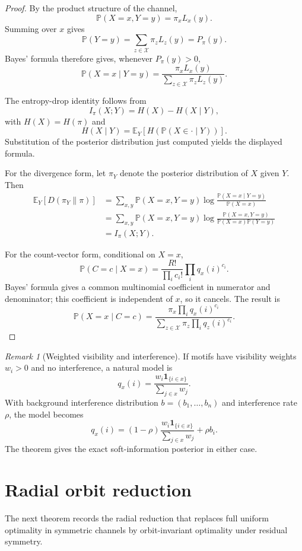 \documentclass[11pt]{article}
\theoremstyle{definition}
\theoremstyle{remark}
\newtheorem{remark}{Remark}
\newcommand{\E}{\mathbb E}
\newcommand{\Pbb}{\mathbb P}
\newcommand{\1}{\mathbf 1}
\begin{document}
\begin{proof}
By the product structure of the channel,
\[
  \Pbb(X=x,Y=y)=\pi_x L_x(y).
\]
Summing over \(x\) gives
\[
  \Pbb(Y=y)=\sum_{z\in\mathcal X}\pi_zL_z(y)=P_\pi(y).
\]
Bayes' formula therefore gives, whenever \(P_\pi(y)>0\),
\[
  \Pbb(X=x\mid Y=y)=
  \frac{\pi_xL_x(y)}{\sum_{z\in\mathcal X}\pi_zL_z(y)}.
\]

The entropy-drop identity follows from
\[
  I_\pi(X;Y)=H(X)-H(X\mid Y),
\]
with \(H(X)=H(\pi)\) and
\[
  H(X\mid Y)=\E_Y[H(\Pbb(X\in\cdot\mid Y))].
\]
Substitution of the posterior distribution just computed yields the displayed formula.

For the divergence form, let \(\pi_Y\) denote the posterior distribution of \(X\) given \(Y\).  Then
\[
\begin{aligned}
  \E_Y[D(\pi_Y\|\pi)]
  &=\sum_{x,y}\Pbb(X=x,Y=y)
    \log\frac{\Pbb(X=x\mid Y=y)}{\Pbb(X=x)} \\
  &=\sum_{x,y}\Pbb(X=x,Y=y)
    \log\frac{\Pbb(X=x,Y=y)}{\Pbb(X=x)\Pbb(Y=y)} \\
  &=I_\pi(X;Y).
\end{aligned}
\]

For the count-vector form, conditional on \(X=x\),
\[
  \Pbb(C=c\mid X=x)=
  \frac{R!}{\prod_i c_i!}\prod_i q_x(i)^{c_i}.
\]
Bayes' formula gives a common multinomial coefficient in numerator and denominator; this coefficient is independent of \(x\), so it cancels.  The result is
\[
  \Pbb(X=x\mid C=c)=
  \frac{\pi_x\prod_i q_x(i)^{c_i}}
       {\sum_{z\in\mathcal X}\pi_z\prod_i q_z(i)^{c_i}}.
\]
\end{proof}

\begin{remark}[Weighted visibility and interference]
If motifs have visibility weights \(w_i>0\) and no interference, a natural model is
\[
  q_x(i)=\frac{w_i\1_{\{i\in x\}}}{\sum_{j\in x}w_j}.
\]
With background interference distribution \(b=(b_1,\ldots,b_n)\) and interference rate \(\rho\), the model becomes
\[
  q_x(i)=(1-\rho)\frac{w_i\1_{\{i\in x\}}}{\sum_{j\in x}w_j}+\rho b_i.
\]
The theorem gives the exact soft-information posterior in either case.
\end{remark}

\section{Radial orbit reduction}

The next theorem records the radial reduction that replaces full uniform optimality in symmetric channels by orbit-invariant optimality under residual symmetry.
\end{document}

